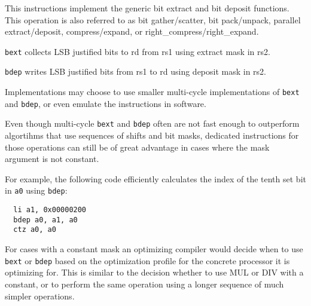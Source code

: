 This instructions implement the generic bit extract and bit deposit functions.
This operation is also referred to as bit gather/scatter, bit pack/unpack,
parallel extract/deposit, compress/expand, or right\_compress/right\_expand.

\texttt{bext} collects LSB justified bits to rd from rs1 using extract mask in rs2.

\texttt{bdep} writes LSB justified bits from rs1 to rd using deposit mask in rs2.



Implementations may choose to use smaller multi-cycle implementations of
\texttt{bext} and \texttt{bdep}, or even emulate the instructions in software.

Even though multi-cycle \texttt{bext} and \texttt{bdep} often are not fast
enough to outperform algortihms that use sequences of shifts and bit masks,
dedicated instructions for those operations can still be of great advantage in
cases where the mask argument is not constant.

For example, the following code efficiently calculates the index of the tenth
set bit in {\tt a0} using \texttt{bdep}:

\begin{verbatim}
  li a1, 0x00000200
  bdep a0, a1, a0
  ctz a0, a0
\end{verbatim}

For cases with a constant mask an optimizing compiler would decide when to use
\texttt{bext} or \texttt{bdep} based on the optimization profile for the
concrete processor it is optimizing for. This is similar to the decision
whether to use MUL or DIV with a constant, or to perform the same operation
using a longer sequence of much simpler operations.



%
%
%
%
%
%
%
%

